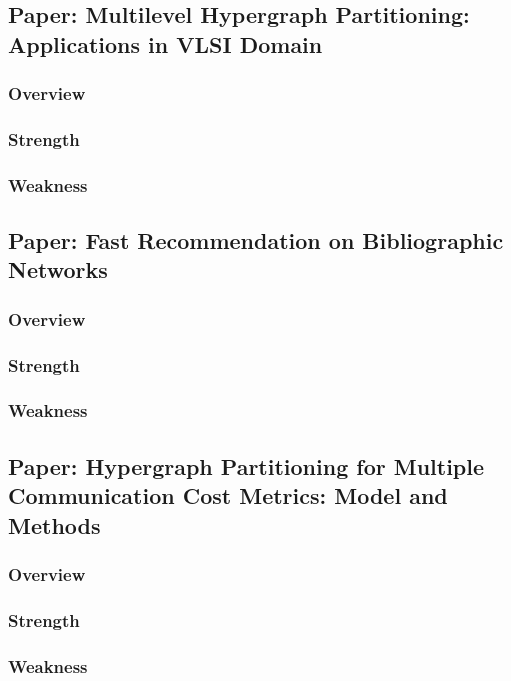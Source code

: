 \documentclass[conference, onecolumn]{IEEEtran}
\begin{document}
\newpage

\subsection{Paper: Multilevel Hypergraph Partitioning: Applications in VLSI Domain}

\subsubsection{Overview}

\subsubsection{Strength}

\subsubsection{Weakness}


\newpage

\subsection{Paper: Fast Recommendation on Bibliographic Networks}

\subsubsection{Overview}

\subsubsection{Strength}

\subsubsection{Weakness}


\newpage

\subsection{Paper: Hypergraph Partitioning for Multiple Communication Cost Metrics: Model and Methods}

\subsubsection{Overview}

\subsubsection{Strength}

\subsubsection{Weakness}
\end{document}
